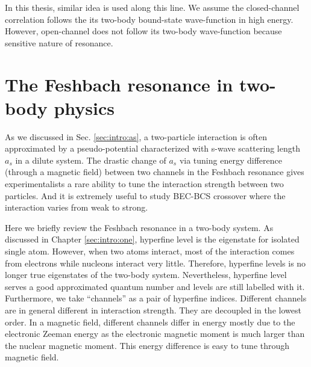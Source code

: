 In this thesis, similar idea is used along this line.  We assume the closed-channel correlation follows the its two-body bound-state wave-function in high energy.   However, open-channel does not follow its two-body  wave-function because sensitive nature of resonance. 
 
 
 \chapter{The  Feshbach resonance in two-body physics\label{sec:intro:twobody}}
 As we discussed in Sec. \ref{sec:intro:as}, a two-particle interaction is often approximated by a pseudo-potential characterized with s-wave scattering length $a_{s}$ in a dilute system.   The drastic  change  of $a_{s}$  via tuning energy difference (through a magnetic field) between two channels in the Feshbach resonance gives  experimentalists a rare ability to tune the interaction strength between two particles.  And it is extremely useful to study BEC-BCS crossover where the interaction varies from weak to strong.  
 
Here we briefly review the Feshbach resonance in a two-body system.   As discussed in Chapter \ref{sec:intro:one}, hyperfine level is the eigenstate for isolated single atom.  However, when two atoms interact, most of the interaction comes from  electrons while nucleons interact very little.  Therefore, hyperfine levels is no longer true eigenstates of the two-body system.  Nevertheless, hyperfine level serves a good approximated quantum number and levels are still labelled with it. Furthermore, we take ``channels'' as a pair of hyperfine indices.  Different channels are in general different in interaction strength.  They are decoupled in the lowest order.  In a magnetic field, different channels differ in energy mostly due to the electronic Zeeman energy  as the electronic magnetic moment is much larger than the nuclear magnetic moment.  This energy difference is easy to tune through magnetic field.  

